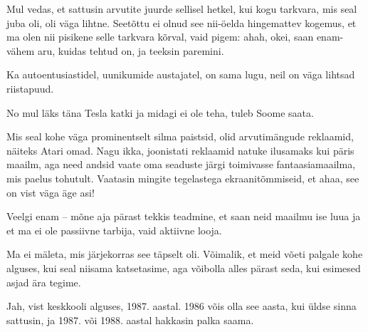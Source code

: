 
Mul vedas, et sattusin arvutite juurde sellisel 
hetkel, kui kogu tarkvara, mis seal juba oli, oli väga lihtne. 
Seetõttu ei olnud see nii-öelda hingemattev kogemus, et ma olen nii 
pisikene selle tarkvara kõrval, vaid pigem: ahah, okei, saan enam-vähem 
aru, kuidas tehtud on, ja teeksin paremini.


Ka autoentusiastidel, uunikumide austajatel, on sama lugu, neil on 
väga lihtsad riistapuud.


No mul läks täna Tesla katki ja midagi ei ole teha, tuleb Soome saata.


Mis seal kohe väga prominentselt silma paistsid, olid 
arvutimängude reklaamid, näiteks Atari omad. Nagu 
ikka, joonistati reklaamid natuke ilusamaks kui päris maailm, aga 
need andsid vaate oma seaduste järgi toimivasse fantaasiamaailma, 
mis paelus tohutult. Vaatasin mingite tegelastega ekraanitõmmiseid, et ahaa, see on vist väga äge asi!


Veelgi enam -- mõne aja pärast tekkis teadmine, et saan neid maailmu ise luua ja et ma ei ole passiivne tarbija, vaid aktiivne looja.


Ma ei mäleta, mis järjekorras see täpselt oli. Võimalik, et meid võeti palgale 
kohe alguses, kui seal niisama katsetasime, aga võibolla alles
pärast seda, kui esimesed asjad ära tegime.


Jah, vist keskkooli alguses, 1987. aastal. 1986 võis olla see aasta, kui üldse sinna 
sattusin, ja 1987. või 1988. aastal hakkasin palka saama. 


